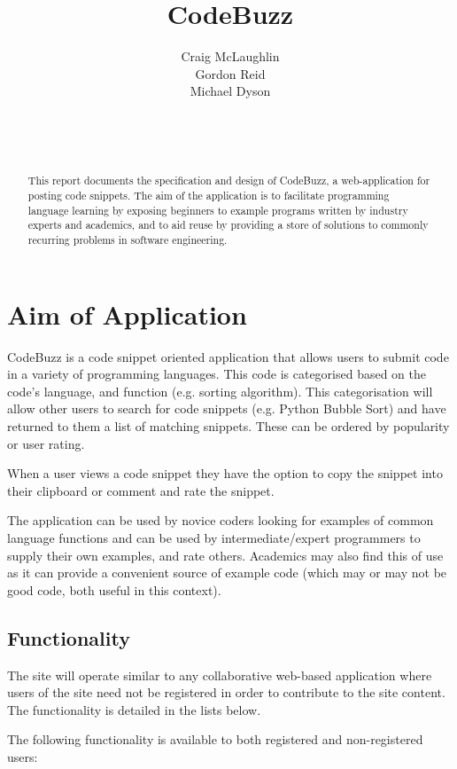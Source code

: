 \documentclass{sig-alt-release2}
\title{CodeBuzz}
\author{
\alignauthor
    Craig McLaughlin\\
    Gordon Reid\\
    Michael Dyson\\
	\affaddr{Team Gocky}\\
	\affaddr{DIM3}\\
	\affaddr{Student no.s}\\
    \email{\{1002524M,1002536R,1007389D\}@students.glasgow.ac.uk}
}
\begin{document}
\maketitle

\begin{abstract}

This report documents the specification and design of CodeBuzz,
a web-application for posting code snippets. The aim of the application is
to facilitate programming language learning by exposing beginners to
example programs written by industry experts and academics, and to
aid reuse by providing a store of solutions to commonly recurring
problems in software engineering. 
\end{abstract}

\section{Aim of Application}

CodeBuzz is a code snippet oriented application that allows users to submit code
in a variety of programming languages. This code is categorised based on the
code's language, and function (e.g. sorting algorithm). This categorisation
will allow other users to search for code snippets (e.g. Python Bubble Sort)
and have returned to them a list of matching snippets. These can be ordered
by popularity or user rating.

When a user views a code snippet they have the option to copy the snippet into
their clipboard or comment and rate the snippet.

The application can be used by novice coders looking for examples of common
language functions and can be used by intermediate/expert programmers to supply
their own examples, and rate others. Academics may also find this of use as
it can provide a convenient source of example code (which may or may not be
good code, both useful in this context).

\subsection{Functionality}
\label{sec:functionality}

The site will operate similar to any collaborative web-based application
where users of the site need not be registered in order to contribute
to the site content. The functionality is detailed in the lists below.

The following functionality is available to both registered and
non-registered users:
\end{document}
